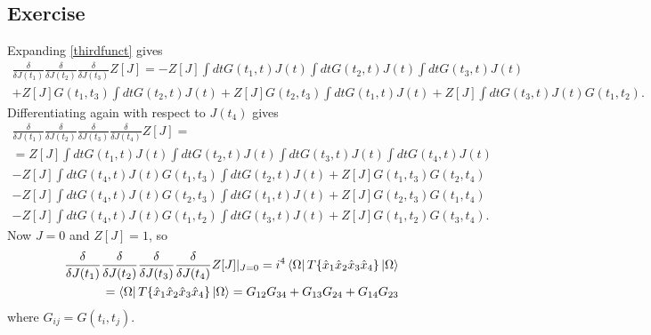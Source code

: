 \subsection{Exercise}
Expanding \eqref{thirdfunct} gives 
\begin{align}
    \frac \delta {\delta J(t_1)}\frac \delta {\delta J(t_2)}\frac \delta {\delta J(t_3)} Z[J]=-Z[J]\int dt G(t_1,t)J(t)\int dt G(t_2,t)J(t)\int dt G(t_3,t)J(t)\\+Z[J]G(t_1,t_3)\int dt G(t_2,t)J(t)+Z[J]G(t_2,t_3)\int dt G(t_1,t)J(t)+Z[J]\int dt G(t_3,t)J(t)G(t_1,t_2).
\end{align}
Differentiating again with respect to $J(t_4)$ gives
\begin{align}
    \frac \delta {\delta J(t_1)}\frac \delta {\delta J(t_2)}\frac \delta {\delta J(t_3)}\frac \delta {\delta J(t_4)} Z[J]=\\=Z[J]\int dt G(t_1,t)J(t)\int dt G(t_2,t)J(t)\int dt G(t_3,t)J(t)\int dt G(t_4,t)J(t) \\-Z[J]\int dt G(t_4,t)J(t)G(t_1,t_3)\int dt G(t_2,t)J(t)+Z[J]G(t_1,t_3)G(t_2,t_4)\\-Z[J]\int dt G(t_4,t)J(t)G(t_2,t_3)\int dt G(t_1,t)J(t)+Z[J]G(t_2,t_3)G(t_1,t_4)\\-Z[J]\int dt G(t_4,t)J(t)G(t_1,t_2)\int dt G(t_3,t)J(t)+Z[J]G(t_1,t_2)G(t_3,t_4).
\end{align}
Now $J=0$ and $Z[J]=1$, so 
\begin{align}
    \frac \delta {\delta J(t_1)}\frac \delta {\delta J(t_2)}\frac \delta {\delta J(t_3)}\frac \delta {\delta J(t_4)} Z[J]|_{J=0}=i^4\bra{\Omega}T\{\hat x_1 \hat x_2 \hat x_3 \hat x_4 \} \ket{\Omega}\\=\bra{\Omega}T\{\hat x_1 \hat x_2 \hat x_3 \hat x_4 \} \ket{\Omega}=G_{12}G_{34}+G_{13}G_{24}+G_{14}G_{23}
\end{align}
where $G_{ij}=G(t_i,t_j)$.




